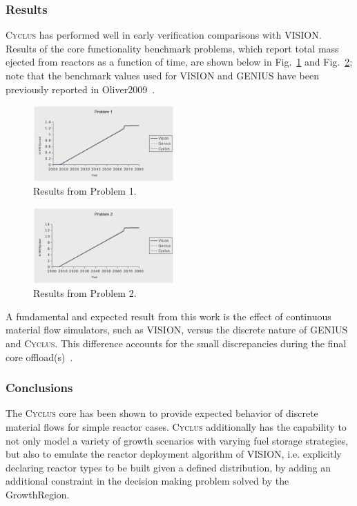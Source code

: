\documentclass{anstrans}
\begin{document}
\subsubsection{Results}
\textsc{Cyclus} has performed well in early verification comparisons with VISION.
Results of the core functionality benchmark problems, which report total mass 
ejected from reactors as a function of time, are shown below in Fig.~\ref{fig:p1} 
and Fig.~\ref{fig:p2}; note that the benchmark values used for VISION and GENIUS have 
been previously reported in Oliver2009~\cite{oliver2009}.
\begin{figure}[ht]
  \centering
  \includegraphics[width=0.48\textwidth]{p1.ps}
  \caption{Results from Problem 1.}
  \label{fig:p1}
\end{figure}
\begin{figure}[ht]
  \centering
  \includegraphics[width=0.48\textwidth]{p2.ps}
  \caption{Results from Problem 2.}
  \label{fig:p2}
\end{figure}

A fundamental and expected result from this work is the effect of continuous
material flow simulators, such as VISION, versus the discrete nature of 
GENIUS and \textsc{Cyclus}. This difference accounts for the small discrepancies
during the final core offload(s)~\cite{oliver2009}.

\subsubsection{Conclusions}
The \textsc{Cyclus} core has been shown to provide expected behavior of discrete 
material flows for simple reactor cases. \textsc{Cyclus} additionally has the 
capability to not only model a variety of growth scenarios with varying fuel storage 
strategies, but also to emulate the reactor deployment algorithm of VISION, i.e. 
explicitly declaring reactor types to be built given a defined distribution, by adding 
an additional constraint in the decision making problem solved by the GrowthRegion.
\end{document}
